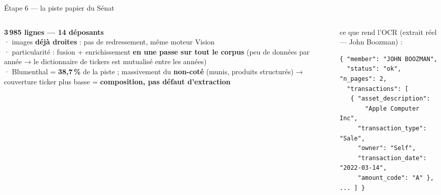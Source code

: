 \documentclass[11pt,aspectratio=169]{beamer}
\newcommand{\badgel}[2]{\colorbox{#1}{\textcolor{black!80}{\footnotesize\textbf{#2}}}}
\begin{document}
\begin{frame}[fragile]{Étape 6 — la piste papier du Sénat}
  \begin{columns}[T]
    \begin{column}{0.50\textwidth}
      \badgel{socr}{3\,985 lignes — 14 déposants}\\[2mm]
      {\footnotesize
      · images \textbf{déjà droites} : pas de redressement, même moteur Vision\\[1mm]
      · particularité : fusion + enrichissement \textbf{en une passe sur tout le corpus}
        (peu de données par année → le dictionnaire de tickers est mutualisé
        entre les années)\\[1mm]
      · Blumenthal = \textbf{38,7\,\%} de la piste ; massivement du
        \textbf{non-coté} (munis, produits structurés) → couverture ticker
        plus basse = \textbf{composition, pas défaut d'extraction}}
    \end{column}
    \begin{column}{0.48\textwidth}
      {\scriptsize ce que rend l'OCR (extrait réel — John Boozman) :}
\begin{Verbatim}[fontsize=\scriptsize, frame=single, rulecolor=\color{black!25}]
{ "member": "JOHN BOOZMAN",
  "status": "ok", "n_pages": 2,
  "transactions": [
   { "asset_description":
       "Apple Computer Inc",
     "transaction_type": "Sale",
     "owner": "Self",
     "transaction_date": "2022-03-14",
     "amount_code": "A" }, ... ] }
\end{Verbatim}
    \end{column}
  \end{columns}
\end{frame}
\end{document}
